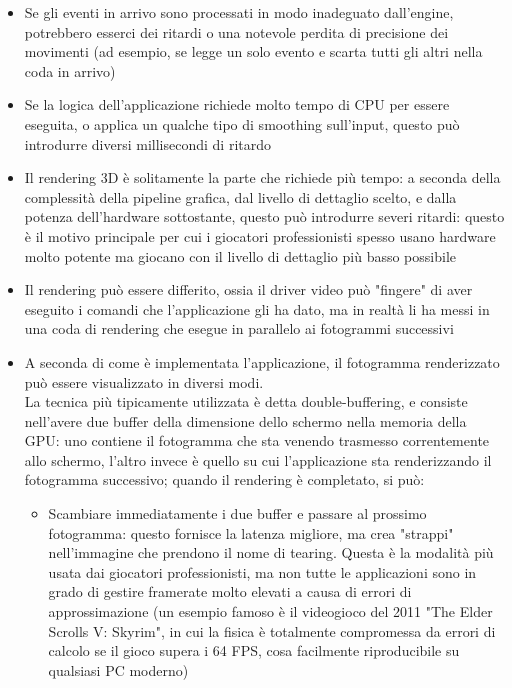 \begin{itemize}
	\item Se gli eventi in arrivo sono processati in modo inadeguato dall'engine, potrebbero esserci dei ritardi o una notevole perdita di precisione dei movimenti (ad esempio, se legge un solo evento e scarta tutti gli altri nella coda in arrivo)
	\item Se la logica dell'applicazione richiede molto tempo di CPU per essere eseguita, o applica un qualche tipo di smoothing sull'input, questo può introdurre diversi millisecondi di ritardo
	\item Il rendering 3D è solitamente la parte che richiede più tempo: a seconda della complessità della pipeline grafica, dal livello di dettaglio scelto, e dalla potenza dell'hardware sottostante, questo può introdurre severi ritardi: questo è il motivo principale per cui i giocatori professionisti spesso usano hardware molto potente ma giocano con il livello di dettaglio più basso possibile
	\item Il rendering può essere differito, ossia il driver video può "fingere" di aver eseguito i comandi che l'applicazione gli ha dato, ma in realtà li ha messi in una coda di rendering che esegue in parallelo ai fotogrammi successivi
	\item A seconda di come è implementata l'applicazione, il fotogramma renderizzato può essere visualizzato in diversi modi.\\
	La tecnica più tipicamente utilizzata è detta double-buffering, e consiste nell'avere due buffer della dimensione dello schermo nella memoria della GPU: uno contiene il fotogramma che sta venendo trasmesso correntemente allo schermo, l'altro invece è quello su cui l'applicazione sta renderizzando il fotogramma successivo; quando il rendering è completato, si può:
	\begin{itemize}
		\item Scambiare immediatamente i due buffer e passare al prossimo fotogramma: questo fornisce la latenza migliore, ma crea "strappi" nell'immagine che prendono il nome di tearing. Questa è la modalità più usata dai giocatori professionisti, ma non tutte le applicazioni sono in grado di gestire framerate molto elevati a causa di errori di approssimazione (un esempio famoso è il videogioco del 2011 "The Elder Scrolls V: Skyrim", in cui la fisica è totalmente compromessa da errori di calcolo se il gioco supera i 64 FPS, cosa facilmente riproducibile su qualsiasi PC moderno)

\end{itemize}
\end{itemize}
